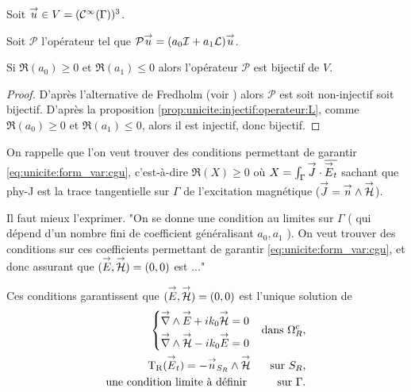   \begin{prop}
    \label{prop:unicite:inversible:operateur:L}
    Soit \({\overset{\rightarrow}{u}} \in V=(\mathcal{C}^\infty(\Gamma))^3\).
    
    Soit \(\mathcal{P}\) l'opérateur tel que \(\mathcal{P}{\overset{\rightarrow}{u}} = (a_0{\mathcal{I}} + a_1 \mathcal{L}){\overset{\rightarrow}{u}}\).

    Si \(\Re(a_0)\ge 0\) et \(\Re(a_1)\le 0\) alors l'opérateur \(\mathcal{P}\) est bijectif de \(V\).
  \end{prop}
  \begin{proof}
    D'après l'alternative de Fredholm (voir \cite[Théorème~VI.6, p.~92]{brezis_analyse_1996})%
      alors \(\mathcal{P}\) est soit non-injectif soit bijectif. D'après la proposition \ref{prop:unicite:injectif:operateur:L}, comme \(\Re(a_0)\ge 0\) et \(\Re(a_1)\le 0\), alors il est injectif, donc bijectif.
  \end{proof}


  On rappelle que l'on veut trouver des conditions permettant de garantir \eqref{eq:unicite:form_var:cgu}, c'est-à-dire \(\Re(X)\ge0\) où \(X = \int_\Gamma {\overset{\rightarrow}{J}} \cdot {\overline{{\overset{\rightarrow}{E}}_t}}\) sachant que \gls{phy-J} est la trace tangentielle sur \(\Gamma\) de l’excitation magnétique (\({\overset{\rightarrow}{J}} = {\overset{\rightarrow}{n}} \wedge {\overset{\rightarrow}{\mathcal{H}}}\)).

  \begin{REM}
  Il faut mieux l'exprimer. "On se donne une condition au limites sur \(\Gamma\) ( qui dépend d'un nombre fini de coefficient généralisant \(a_0,a_1\) ). On veut trouver des conditions sur ces coefficients permettant de garantir  \eqref{eq:unicite:form_var:cgu}, et donc assurant que \(({\overset{\rightarrow}{E}},{\overset{\rightarrow}{\mathcal{H}}}) = (0,0)\) est ..."
  \end{REM}
  Ces conditions garantissent que \(({\overset{\rightarrow}{E}},{\overset{\rightarrow}{\mathcal{H}}}) = (0,0)\) est l'unique solution de 
  \begin{equation}
    \label{eq:unicite:probleme_sans_ci}
    \begin{aligned}
      \left\lbrace
      \begin{aligned}
        {\overset{\rightarrow}{\nabla}}\wedge{{\overset{\rightarrow}{E}}} + ik_0{\overset{\rightarrow}{\mathcal{H}}} &= 0
        \\
        {\overset{\rightarrow}{\nabla}}\wedge{{\overset{\rightarrow}{\mathcal{H}}}} - ik_0{\overset{\rightarrow}{E}} &= 0
      \end{aligned}
      \right. && \text{dans \(\Omega^c_R\)},
      \\
      \operatorname{T_R}({\overset{\rightarrow}{E}}_t) = - {\overset{\rightarrow}{n}}_{S_R} \wedge {\overset{\rightarrow}{\mathcal{H}}} && \text{sur \(S_R\),}
      \\
      \text{une condition limite à définir }  && \text{sur \(\Gamma\).}
    \end{aligned}
  \end{equation}

